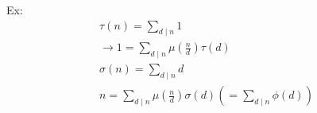     Ex: 
    \begin{align*}
        \tau(n) = \sum_{d\mid n}^{} 1 \\
        \rightarrow 1 = \sum_{d\mid n}^{} \mu(\frac{n}{d})\tau(d) \\
        \sigma(n) = \sum_{d\mid n}^{} d \\
        n = \sum_{d\mid n}^{}\mu(\frac{n}{d})\sigma(d) (=\sum_{d\mid n}^{}\phi(d))
    \end{align*}